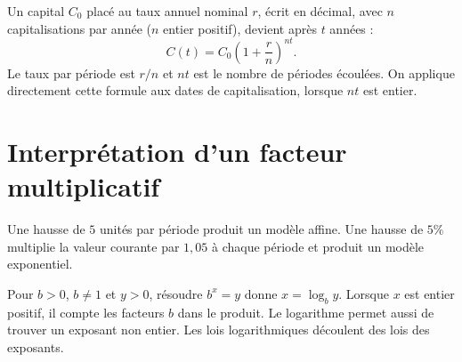 \begin{examplebox}[title={Exemple : intérêts composés}]
Un capital $C_0$ placé au taux annuel nominal $r$, écrit en décimal, avec $n$ capitalisations par année ($n$ entier positif), devient après $t$ années :
\[
C(t)=C_0\left(1+\frac rn\right)^{nt}.
\]
Le taux par période est $r/n$ et $nt$ est le nombre de périodes écoulées. On applique directement cette formule aux dates de capitalisation, lorsque $nt$ est entier.
\end{examplebox}


\section{Interprétation d'un facteur multiplicatif}
\label{manual:section:06.06}

\begin{visualbox}
Une hausse de $5$ unités par période produit un modèle affine. Une hausse de $5\%$ multiplie la valeur courante par $1{,}05$ à chaque période et produit un modèle exponentiel.
\end{visualbox}

\begin{center}
\end{center}

\begin{connectionbox}
Pour $b>0$, $b\ne1$ et $y>0$, résoudre $b^x=y$ donne $x=\log_b y$. Lorsque $x$ est entier positif, il compte les facteurs $b$ dans le produit. Le logarithme permet aussi de trouver un exposant non entier. Les lois logarithmiques découlent des lois des exposants.
\end{connectionbox}

